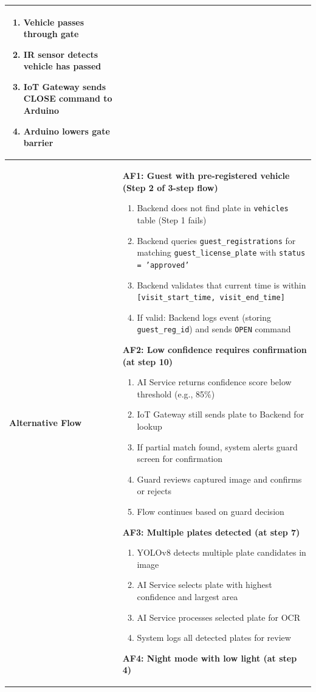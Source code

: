 \documentclass[a4paper]{article}
\newlength{\ucLeft}
\begin{document}
\begin{longtable}{|>{\bfseries}p{\ucLeft}|
                p{\dimexpr\textwidth-\ucLeft-4\tabcolsep-3\arrayrulewidth\relax}|}
\begin{enumerate}[leftmargin=*, nosep, topsep=0pt, partopsep=0pt, parsep=0pt]
    \item Vehicle passes through gate
    \item IR sensor detects vehicle has passed
    \item IoT Gateway sends CLOSE command to Arduino
    \item Arduino lowers gate barrier
\end{enumerate}
\\ \hline
Alternative Flow &
\noindent \textbf{AF1: Guest with pre-registered vehicle (Step 2 of 3-step flow)}
\begin{enumerate}
    \item Backend does not find plate in \texttt{vehicles} table (Step 1 fails)
    \item Backend queries \texttt{guest\_registrations} for matching \texttt{guest\_license\_plate} with \texttt{status = 'approved'}
    \item Backend validates that current time is within \texttt{[visit\_start\_time, visit\_end\_time]}
    \item If valid: Backend logs event (storing \texttt{guest\_reg\_id}) and sends \texttt{OPEN} command
\end{enumerate}
\noindent \textbf{AF2: Low confidence requires confirmation (at step 10)}
\begin{enumerate}
    \item AI Service returns confidence score below threshold (e.g., 85\%)
    \item IoT Gateway still sends plate to Backend for lookup
    \item If partial match found, system alerts guard screen for confirmation
    \item Guard reviews captured image and confirms or rejects
    \item Flow continues based on guard decision
\end{enumerate}
\noindent \textbf{AF3: Multiple plates detected (at step 7)}
\begin{enumerate}
    \item YOLOv8 detects multiple plate candidates in image
    \item AI Service selects plate with highest confidence and largest area
    \item AI Service processes selected plate for OCR
    \item System logs all detected plates for review
\end{enumerate}
\noindent \textbf{AF4: Night mode with low light (at step 4)}
\begin{enumerate}

\end{enumerate}
\end{longtable}
\end{document}
